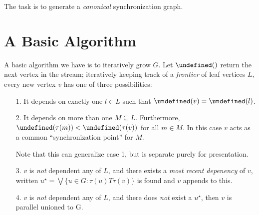 \documentclass[12pt]{article}
\let\depth\undefined
\newcommand{\depth}{\mathbf{depth}}
\let\next\undefined
\newcommand{\next}{\mathbf{next}}
\begin{document}
The task is to generate a \textit{canonical} synchronization graph.


\section{A Basic Algorithm}
A basic algorithm we have is to iteratively grow \(G\).
Let \(\next()\) return the next vertex in the stream;
iteratively keeping track of a \textit{frontier} of leaf vertices \(L\),
every new vertex \(v\) has one of three possibilities:
\begin{enumerate}
  \item[1.]
    It depends on exactly one \(l \in L\)
    such that \(\depth (v) = \depth(l)\).

  \item[2.]
    It depends on more than one \(M \subseteq L\).
    Furthermore, \(\depth(\tau(m)) < \depth(\tau(v))\)
    for all \(m \in M\).
    In this case \(v\) acts as a common ``synchronization point''
    for \(M\).

    Note that this can generalize case 1,
    but is separate purely for presentation.

  \item[3.]
    \(v\) is \textit{not} dependent any of \(L\),
    and there exists a \textit{most recent depenency} of \(v\),
    written
    \(u^\star = \bigvee \{ u \in G : \tau (u) T \tau (v)\} \)
    is found and \(v\) appends to this.

  \item[4.]
    \(v\) is \textit{not} dependent any of \(L\),
    and there does \textit{not} exist a \(u^\star\),
    then \(v\) is parallel unioned to G.
  
\end{enumerate}
\end{document}
